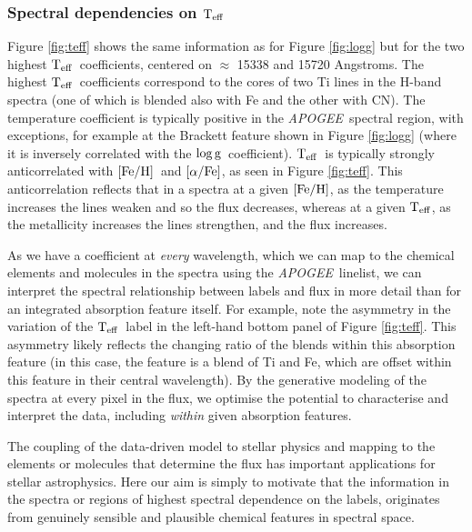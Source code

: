 \documentclass[12pt, preprint]{aastex}
\newcommand{\project}[1]{\textsl{#1}}
\newcommand{\apogee}{\project{APOGEE}}
\newcommand{\teff}{\mbox{$\rm T_{eff}$}}
\newcommand{\feh}{\mbox{$\rm [Fe/H]$}}
\newcommand{\alphafe}{\mbox{$\rm [\alpha/Fe]$}}
\newcommand{\logg}{\mbox{$\rm \log g$}}
\begin{document}
\subsubsection{Spectral dependencies on \teff} 

Figure \ref{fig:teff} shows the same information as for Figure \ref{fig:logg} but for the two highest \teff\ coefficients, centered on $\approx$ 15338 and 15720 Angstroms. The highest \teff\ coefficients correspond to the cores of two Ti lines in the H-band spectra (one of which is blended also with Fe and the other with CN). The temperature coefficient is typically positive in the \apogee\ spectral region, with exceptions, for example at the Brackett feature shown in Figure \ref{fig:logg} (where it is inversely correlated with the \logg\ coefficient). \teff\ is typically strongly anticorrelated with \feh\ and \alphafe, as seen in Figure \ref{fig:teff}. This anticorrelation reflects that in a spectra at a given \feh, as the temperature increases the lines weaken and so the flux decreases, whereas at a given \teff, as the metallicity increases the lines strengthen, and the flux increases. 

As we have a coefficient at \textit{every} wavelength, which we can map to the chemical elements and molecules in the spectra using the \apogee\ linelist, we can interpret the spectral relationship between labels and flux in more detail than for an integrated absorption feature itself.  For example, note the asymmetry in the variation of the \teff\ label in the left-hand bottom panel of Figure \ref{fig:teff}. This asymmetry likely reflects the changing ratio of the blends within this absorption feature (in this case, the feature is a blend of Ti and Fe, which are offset within this feature in their central wavelength). By the generative modeling of the spectra at every pixel in the flux, we optimise the potential to characterise and interpret the data, including \textit{within} given absorption features. 

The coupling of the data-driven model to stellar physics and mapping to the elements or molecules that determine the flux has important applications for stellar astrophysics. Here our aim is simply to motivate that the information in the spectra or regions of highest spectral dependence on the labels, originates from genuinely sensible and plausible chemical features in spectral space.  

\end{document}
